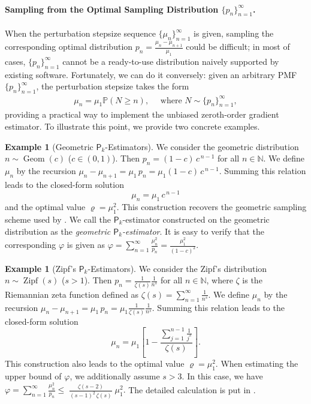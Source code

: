 \documentclass{article}
\newcommand{\PP}{\mathbb{P}}
\theoremstyle{definition}
\newtheorem{example}[definition]{Example}
\theoremstyle{plain}
\theoremstyle{remark}
\newcommand{\sfP}{\mathsf{P}}
\begin{document}
\paragraph{Sampling from the Optimal Sampling Distribution $\{ p_n\}_{n=1}^\infty$.} When the perturbation stepsize sequence $\{\mu_n\}_{n=1}^\infty$ is given, sampling the corresponding optimal distribution $p_n = \frac{\mu_n - \mu_{n+1}}{\mu_1}$ could be difficult; in most of cases, $ \{ p_n\}_{n=1}^\infty$ cannot be a ready-to-use distribution naively supported by existing software. Fortunately, we can do it conversely: given an arbitrary PMF $\{ p_n\}_{n=1}^\infty$, the perturbation stepsize takes the form
\begin{align*}
    \mu_n = \mu_1 \PP(N \geq n), \quad \text{ where } N \sim \{ p_n\}_{n=1}^\infty,
\end{align*}
providing a practical way to implement the unbiased zeroth-order gradient estimator.  
To illustrate this point, we provide two concrete examples.  


\begin{example}[Geometric $\sfP_k$-Estimators] \label{example:geometric}
We consider the geometric distribution $n \sim \operatorname{Geom}(c)$ ($c\in (0,1)$). Then    $p_n = (1-c)\,c^{\,n-1}$ for all $n\in \mathbb{N}$.  We define \(\mu_n\) by the recursion $\mu_n - \mu_{n+1} = \mu_1\,p_n = \mu_1(1-c)\,c^{\,n-1}.$ 
Summing this relation leads to the closed-form solution $$\mu_n = \mu_1\,c^{\,n-1}$$ and the optimal value $\varrho = \mu_1^2$.
This construction recovers the geometric sampling scheme used by \citet{chen2020unbiased}. We call the $\sfP_k$-estimator constructed on the geometric distribution as the \textit{geometric $\sfP_k$-estimator}. It is easy to verify that the corresponding  $\varphi$ is given as  
$\varphi = \sum_{n=1}^\infty \frac{\mu_n^2}{p_n}=\frac{\mu_1^2}{(1-c)^2}.$
\end{example}

\begin{example}[Zipf's $\sfP_k$-Estimators]\label{example:zipf}
We consider the Zipf's  distribution $n \sim \operatorname{Zipf}(s)$ ($s > 1$). Then    $p_n =  \frac{1}{\zeta(s)} \frac{1}{n^s}$ for all $n\in \mathbb{N}$, where $\zeta$ is the Riemannian zeta function defined as $\zeta(s) = \sum_{n=1}^\infty \frac{1}{n^s}.$  We define \(\mu_n\) by the recursion $\mu_n - \mu_{n+1} = \mu_1\,p_n = \mu_1 \frac{1}{\zeta(s)} \frac{1}{n^s}.$
Summing this relation leads to the closed-form solution $$\mu_n = \mu_1 \left[ 1- \frac{\sum_{j=1}^{n-1} \frac{1}{j^s}}{\zeta(s)}\right].$$
This construction also leads to the optimal value $\varrho = \mu_1^2$. When estimating the upper bound of $\varphi$, we  additionally assume $s>3$. In this case, we have
$\varphi = \sum_{n=1}^\infty \frac{\mu_n^2}{p_n}  \le\;\frac{\zeta(s-2)}{(s-1)^2\,\zeta(s)}\;\mu_1^2.$ 
The detailed calculation is put in .
\end{example}   
 
\end{document}
